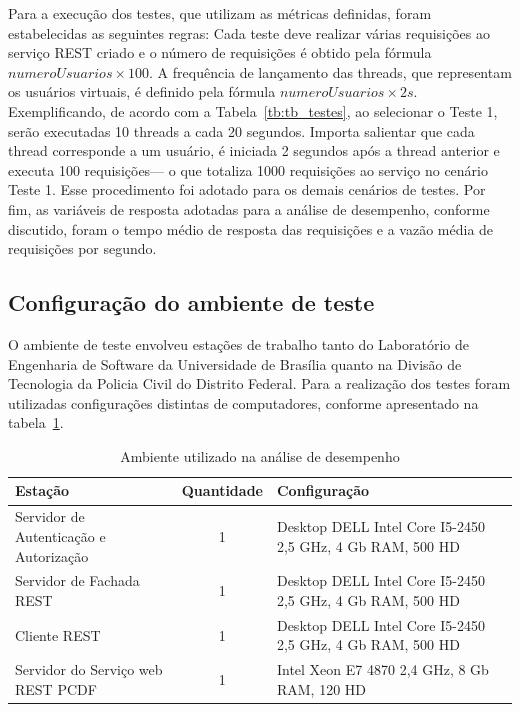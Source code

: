Para a execução dos testes, que utilizam as métricas definidas, foram estabelecidas as seguintes regras: Cada teste deve realizar várias requisições ao serviço REST criado e o número de requisições é obtido pela fórmula $numeroUsuarios \times 100$. A frequência de lançamento das threads, que representam os usuários virtuais, é definido pela fórmula $numeroUsuarios \times 2s$. Exemplificando,
de acordo com a Tabela~\ref{tb:tb_testes}, ao selecionar o Teste 1, serão executadas 10 threads a cada 20 segundos.
Importa salientar que cada thread corresponde a um usuário, é iniciada 2 segundos após a thread anterior e executa 100 requisições---
o que totaliza 1000 requisições ao serviço no cen\'{a}rio Teste 1. Esse procedimento foi adotado para os demais cen\'{a}rios de testes.
Por fim, as variáveis de resposta adotadas para a análise de desempenho, conforme discutido, foram o tempo médio de resposta das requisições e a vazão média de requisições por segundo.

\subsection{Configuração do ambiente de teste}

O ambiente de teste envolveu estações de trabalho tanto do Laboratório de Engenharia de Software da Universidade de Brasília quanto na
Divisão de Tecnologia da Policia Civil do Distrito Federal. Para a realização dos testes foram utilizadas configurações distintas de computadores, conforme apresentado na tabela~\ref{tb:estudo_caso1}.

\begin{table}[h]
\begin{center}
    \begin{tabular}{|p{6cm}|c|p{6cm}|}
    \hline
    Esta\c c\~{a}o                               & Quantidade & Configura\c c\~{a}o \\ \hline
    Servidor de Autenticação e Autorização       & 1          & Desktop DELL Intel Core I5-2450 2,5 GHz, 4 Gb RAM, 500 HD \\ \hline
    Servidor de Fachada REST                     & 1          & Desktop DELL Intel Core I5-2450 2,5 GHz, 4 Gb RAM, 500 HD \\ \hline
    Cliente REST                                 & 1          & Desktop DELL Intel Core I5-2450 2,5 GHz, 4 Gb RAM, 500 HD \\ \hline
    Servidor do Serviço web REST PCDF            & 1          & Intel Xeon E7 4870 2,4 GHz, 8 Gb RAM, 120 HD \\ \hline
    \end{tabular}
    \caption {Ambiente utilizado na análise de desempenho}\label{tb:estudo_caso1}
\end{center}
\end{table}

